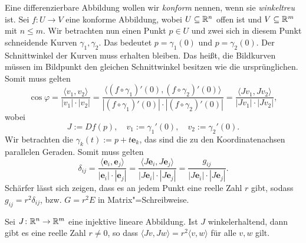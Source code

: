 Eine differenzierbare Abbildung wollen wir
\emph{konform} nennen, wenn
sie \emph{winkeltreu} ist.
Sei $f\colon U\to V$ eine konforme Abbildung, wobei $U\subseteq\mathbb R^n$
offen ist und $V\subseteq\mathbb R^m$ mit $n\le m$. Wir betrachten nun
einen Punkt $p\in U$ und zwei sich in diesem Punkt
schneidende Kurven $\gamma_1,\gamma_2$. Das bedeutet $p=\gamma_1(0)$
und $p=\gamma_2(0)$. Der Schnittwinkel der Kurven muss erhalten
bleiben. Das heißt, die
Bildkurven müssen im Bildpunkt den gleichen Schnittwinkel besitzen
wie die ursprünglichen. Somit muss gelten%
\begin{equation}
\cos\varphi =
\frac{\langle v_1,v_2\rangle}{|v_1|\cdot |v_2|}
= \frac{\langle(f\circ\gamma_1)'(0),(f\circ\gamma_2)'(0)\rangle}
{|(f\circ\gamma_1)'(0)|\cdot |(f\circ\gamma_2)'(0)|}
= \frac{\langle Jv_1,Jv_2\rangle}{|Jv_1|\cdot |Jv_2|},
\end{equation}
wobei
\[J:=Df(p),\quad v_1:=\gamma_1'(0),\quad v_2:=\gamma_2'(0).\]
Wir betrachten die $\gamma_k(t):=p+t\mathbf e_k$, das sind die zu
den Koordinatenachsen parallelen Geraden. Somit muss gelten%
\begin{equation}\label{eq:winkeltreu-ONB}
\delta_{ij} = \frac{\langle\mathbf e_i,\mathbf e_j\rangle}
{|\mathbf e_i|\cdot |\mathbf e_j|}
= \frac{\langle J\mathbf e_i,J\mathbf e_j\rangle}
{|J\mathbf e_i|\cdot |J\mathbf e_j|}
= \frac{g_{ij}}{|J\mathbf e_i|\cdot |J\mathbf e_j|}.
\end{equation}
Schärfer lässt sich zeigen, dass es an jedem Punkt eine reelle Zahl
$r$ gibt, sodass $g_{ij} = r^2\delta_{ij}$,
bzw. $G = r^2 E$ in Matrix"=Schreibweise.

\begin{theorem}\label{konform-lambda}
Sei $J\colon\mathbb R^n\to\mathbb R^m$ eine injektive lineare Abbildung. Ist $J$
winkelerhaltend, dann gibt es eine reelle Zahl $r\ne 0$, so dass
$\langle Jv,Jw\rangle = r^2\langle v,w\rangle$ für alle
$v,w$ gilt.
\end{theorem}

